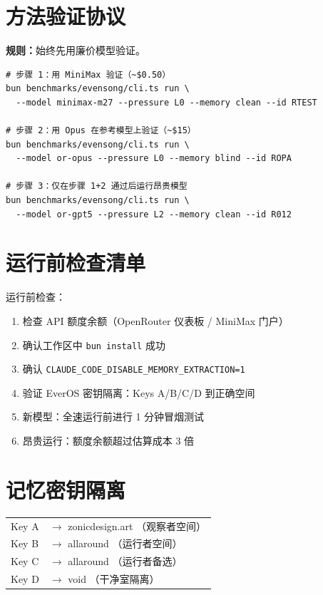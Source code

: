 \documentclass[11pt,a4paper]{article}
\begin{document}
\section{方法验证协议}

\textbf{规则：}始终先用廉价模型验证。

\begin{verbatim}
# 步骤 1：用 MiniMax 验证（~$0.50）
bun benchmarks/evensong/cli.ts run \
  --model minimax-m27 --pressure L0 --memory clean --id RTEST

# 步骤 2：用 Opus 在参考模型上验证（~$15）
bun benchmarks/evensong/cli.ts run \
  --model or-opus --pressure L0 --memory blind --id ROPA

# 步骤 3：仅在步骤 1+2 通过后运行昂贵模型
bun benchmarks/evensong/cli.ts run \
  --model or-gpt5 --pressure L2 --memory clean --id R012
\end{verbatim}

\section{运行前检查清单}

运行前检查：
\begin{enumerate}
  \item 检查 API 额度余额（OpenRouter 仪表板 / MiniMax 门户）
  \item 确认工作区中 \texttt{bun install} 成功
  \item 确认 \texttt{CLAUDE\_CODE\_DISABLE\_MEMORY\_EXTRACTION=1}
  \item 验证 EverOS 密钥隔离：Keys A/B/C/D 到正确空间
  \item 新模型：全速运行前进行 1 分钟冒烟测试
  \item 昂贵运行：额度余额超过估算成本 3 倍
\end{enumerate}

\section{记忆密钥隔离}
\begin{tabular}{ll}
Key A & $\rightarrow$ zonicdesign.art \quad（观察者空间）\\
Key B & $\rightarrow$ allaround \quad（运行者空间）\\
Key C & $\rightarrow$ allaround \quad（运行者备选）\\
Key D & $\rightarrow$ void \quad（干净室隔离）\\
\end{tabular}
\end{document}
